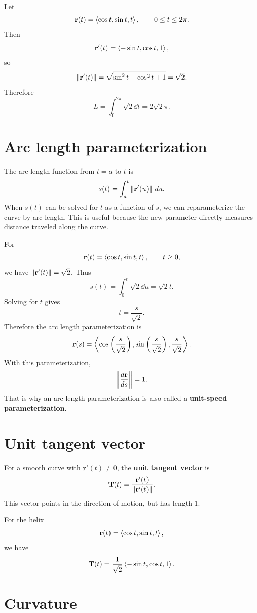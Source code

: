 \begin{examplebox}[title={Example 5.9: Length of a circular helix}]
Let
\[
\mathbf r(t)=\left\langle \cos t,\sin t,t\right\rangle,\qquad 0\le t\le 2\pi.
\]
Then
\[
\mathbf r'(t)=\left\langle -\sin t,\cos t,1\right\rangle,
\]
so
\[
\left\lVert \mathbf r'(t)\right\rVert=\sqrt{\sin^2t+\cos^2t+1}=\sqrt2.
\]
Therefore
\[
L=\int_0^{2\pi}\sqrt2\dd t=2\sqrt2\pi.
\]
\end{examplebox}

\section{Arc length parameterization}

The arc length function from $t=a$ to $t$ is
\[
s(t)=\int_a^t \left\lVert \mathbf r'(u)\right\rVert\,d u.
\]
When $s(t)$ can be solved for $t$ as a function of $s$, we can reparameterize the curve by arc length. This is useful because the new parameter directly measures distance traveled along the curve.

\begin{examplebox}[title={Example 5.10: Reparameterize a helix by arc length}]
For
\[
\mathbf r(t)=\left\langle \cos t,\sin t,t\right\rangle,\qquad t\ge 0,
\]
we have $\left\lVert \mathbf r'(t)\right\rVert=\sqrt2$. Thus
\[
s(t)=\int_0^t\sqrt2\dd u=\sqrt2t.
\]
Solving for $t$ gives
\[
t=\frac{s}{\sqrt2}.
\]
Therefore the arc length parameterization is
\[
\mathbf r(s)=\left\langle \cos\left(\frac{s}{\sqrt2}\right),
\sin\left(\frac{s}{\sqrt2}\right),
\frac{s}{\sqrt2}\right\rangle.
\]
With this parameterization,
\[
\left\lVert \frac{d\mathbf r}{ds}\right\rVert=1.
\]
That is why an arc length parameterization is also called a \textbf{unit-speed parameterization}.
\end{examplebox}

\section{Unit tangent vector}

For a smooth curve with $\mathbf r'(t)\ne\mathbf 0$, the \textbf{unit tangent vector} is
\[
\mathbf T(t)=\frac{\mathbf r'(t)}{\left\lVert \mathbf r'(t)\right\rVert}.
\]
This vector points in the direction of motion, but has length $1$.

For the helix
\[
\mathbf r(t)=\left\langle \cos t,\sin t,t\right\rangle,
\]
we have
\[
\mathbf T(t)=\frac1{\sqrt2}\left\langle -\sin t,\cos t,1\right\rangle.
\]

\section{Curvature}

